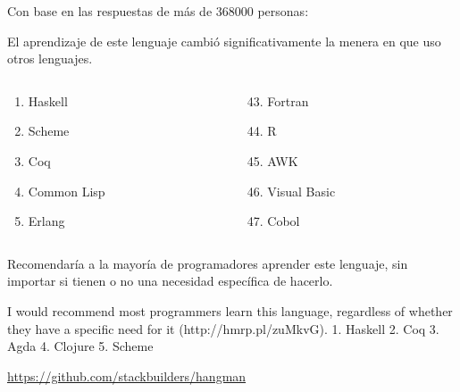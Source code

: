 \documentclass[spanish]{beamer}
\begin{document}
\begin{frame}
  Con base en las respuestas de más de 368000 personas:

  El aprendizaje de este lenguaje cambió significativamente la menera
  en que uso otros lenguajes.
  \begin{columns}[onlytextwidth,T]
    \begin{column}{.5\textwidth}
      \begin{enumerate}
      \item Haskell
      \item Scheme
      \item Coq
      \item Common Lisp
      \item Erlang
      \end{enumerate}
    \end{column}
    \begin{column}{.5\textwidth}
      \begin{enumerate}
      \setcounter{enumi}{42}
      \item Fortran
      \item R
      \item AWK
      \item Visual Basic
      \item Cobol
      \end{enumerate}
    \end{column}
  \end{columns}
\end{frame}




\begin{frame}
  Recomendaría a la mayoría de programadores aprender este lenguaje,
  sin importar si tienen o no una necesidad específica de hacerlo.

  I would recommend most programmers learn this language, regardless
  of whether they have a specific need for it (http://hmrp.pl/zuMkvG).
  1. Haskell 2. Coq 3. Agda 4. Clojure 5. Scheme
\end{frame}


\begin{frame}
  \begin{center}
    \url{https://github.com/stackbuilders/hangman}
  \end{center}
\end{frame}

\end{document}

